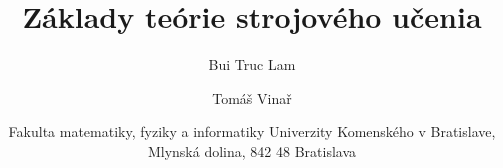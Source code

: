 \documentclass[a4paper,11pt]{article}
\theoremstyle{plain}
\theoremstyle{remark}
\theoremstyle{definition}
\begin{document}
\title{Základy teórie strojového učenia}
\author{Bui Truc Lam \and Tomáš Vinař}
\date{Fakulta matematiky, fyziky a informatiky Univerzity Komenského v Bratislave, Mlynská dolina, 842 48 Bratislava}
\maketitle
  
  \tableofcontents
  \newpage
  
  
  
  
  
   
  
\end{document}
